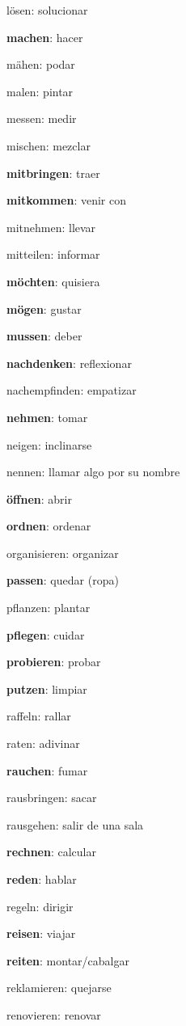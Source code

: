 \begin{multicols}{2}
\begin{myitemize}
\item lösen: solucionar
\item \textbf{machen}: hacer
\item mähen: podar
\item malen: pintar
\item messen: medir
\item mischen: mezclar
\item \textbf{mitbringen}: traer
\item \textbf{mitkommen}: venir con
\item mitnehmen: llevar
\item mitteilen: informar
\item \textbf{möchten}: quisiera
\item \textbf{mögen}: gustar
\item \textbf{mussen}: deber
\item \textbf{nachdenken}: reflexionar
\item nachempfinden: empatizar
\item \textbf{nehmen}: tomar
\item neigen: inclinarse
\item nennen: llamar algo por su nombre
\item \textbf{öffnen}: abrir
\item \textbf{ordnen}: ordenar
\item organisieren: organizar
\item \textbf{passen}: quedar (ropa)
\item pflanzen: plantar
\item \textbf{pflegen}: cuidar
\item \textbf{probieren}: probar
\item \textbf{putzen}: limpiar
\item raffeln: rallar
\item raten: adivinar
\item \textbf{rauchen}: fumar
\item rausbringen: sacar
\item rausgehen: salir de una sala
\item \textbf{rechnen}: calcular
\item \textbf{reden}: hablar
\item regeln: dirigir
\item \textbf{reisen}: viajar
\item \textbf{reiten}: montar/cabalgar
\item reklamieren: quejarse
\item renovieren: renovar

\end{myitemize}
\end{multicols}

